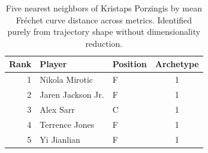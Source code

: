\begin{table}[htbp]
  \centering\small
  \begin{tabular}{rllc}
    \toprule
    Rank & Player & Position & Archetype \\
    \midrule
    1 & Nikola Mirotic & F & 1 \\
    2 & Jaren Jackson Jr. & F & 1 \\
    3 & Alex Sarr & C & 1 \\
    4 & Terrence Jones & F & 1 \\
    5 & Yi Jianlian & F & 1 \\
    \bottomrule
  \end{tabular}
  \caption{Five nearest neighbors of Kristaps Porzingis by mean Fr\'{e}chet curve distance across metrics. Identified purely from trajectory shape without dimensionality reduction.}
  \label{tab:Kristaps_Porzingis_frechet_curve_neighbors}
\end{table}


